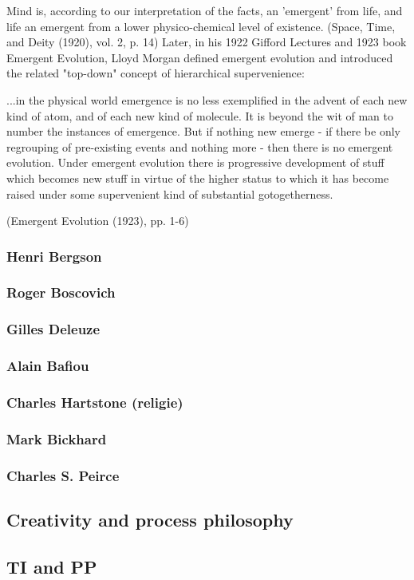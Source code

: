 \documentclass[a4paper]{Thesis}
\begin{document}
	Mind is, according to our interpretation of the facts, an 'emergent' from life, and life an emergent from a lower physico-chemical level of existence.
	(Space, Time, and Deity (1920), vol. 2, p. 14)
	Later, in his 1922 Gifford Lectures and 1923 book Emergent Evolution, Lloyd Morgan defined emergent evolution and introduced the related "top-down" concept of hierarchical supervenience:
	
	...in the physical world emergence is no less exemplified in the advent of each new kind of atom, and of each new kind of molecule. It is beyond the wit of man to number the instances of emergence. But if nothing new emerge - if there be only regrouping of pre-existing events and nothing more - then there is no emergent evolution.
	Under emergent evolution there is progressive development of stuff which becomes new stuff in virtue of the higher status to which it has become raised under some supervenient kind of substantial gotogetherness.
	
	(Emergent Evolution (1923), pp. 1-6)
	
	\subsubsection{Henri Bergson}
	\subsubsection{Roger Boscovich}
	\subsubsection{Gilles Deleuze}
	\subsubsection{Alain Bafiou}
	\subsubsection{Charles Hartstone (religie)}
	\subsubsection{Mark Bickhard}
	\subsubsection{Charles S. Peirce}
	
	\subsection{Creativity and process philosophy}
	\subsection{TI and PP}
	
	
	
	
\end{document}
